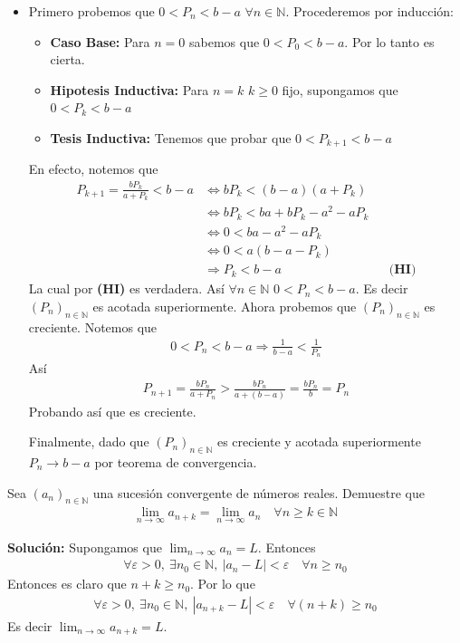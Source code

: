 \documentclass[12pt]{book}
\begin{document}
\begin{itemize}
    \item[\textbf{c)}] Primero probemos que $0<P_n < b-a$ $\forall n \in \mathbb{N}$. Procederemos por inducción:
    \begin{itemize}
        \item \textbf{Caso Base:}  Para $n=0$ sabemos que $0 < P_0 < b-a$. Por lo tanto es cierta.
        \item \textbf{Hipotesis Inductiva:} Para $n=k$ $k \geq 0$ fijo, supongamos que $0<P_k < b-a$ 
        \item \textbf{Tesis Inductiva:} Tenemos que probar que $0<P_{k+1} < b-a$
    \end{itemize}
    En efecto, notemos que 
    \begin{align*}
        P_{k+1}= \frac{b P_k}{a+P_k} < b-a &\Longleftrightarrow bP_k< (b-a)(a+P_k) \\
        &\Longleftrightarrow bP_k < ba + bP_k -a^2-a P_k \\
        &\Longleftrightarrow 0 < ba-a^2-aP_k \\
        &\Longleftrightarrow 0 < a(b-a-P_k) \\
        &\Longrightarrow P_k < b-a && \textbf{(HI)}
    \end{align*}
    La cual por \textbf{(HI)} es verdadera. Así $\forall n \in \mathbb{N}$ $0<P_n < b-a$. Es decir $(P_n)_{n \in \mathbb{N}}$ es acotada superiormente. Ahora probemos que $(P_n)_{n \in \mathbb{N}}$  es creciente. Notemos que 
    \begin{align*}
        0<P_n < b-a \Longrightarrow \frac{1}{b-a} < \frac{1}{P_n}
    \end{align*}
    Así
    \begin{align*}
        P_{n+1}=\frac{bP_n}{a+P_n} > \frac{bP_n}{a+(b-a)} = \frac{bP_n}{b} = P_n
    \end{align*}
    Probando así que es creciente. 

    Finalmente, dado que $(P_n)_{n \in \mathbb{N}}$ es creciente y acotada superiormente $P_n \to b-a$ por teorema de convergencia. 
\end{itemize}
\begin{prob}{}{}
    Sea $(a_n)_{n \in \mathbb{N}}$ una sucesión convergente de números reales. Demuestre que 
    \begin{align*}
        \lim_{n \to \infty} a_{n+k}=\lim_{n \to \infty}a_n \quad \forall n \geq k \in \mathbb{N}
    \end{align*}
\end{prob}
\textbf{Solución:}
Supongamos que $\displaystyle\lim_{n \to \infty}a_n =L $. Entonces 
\begin{align*}
    \forall \varepsilon>0, \ \exists n_0 \in \mathbb{N}, \ |a_n - L| < \varepsilon \quad \forall n \geq n_0
\end{align*}
Entonces es claro que $n+k \geq n_0$. Por lo que 
\begin{align*}
     \forall \varepsilon>0, \ \exists n_0 \in \mathbb{N}, \ |a_{n+k} - L| < \varepsilon \quad \forall (n+k )\geq n_0
\end{align*}
Es decir $\displaystyle\lim_{n \to \infty} a_{n+k} = L$.
\end{document}
